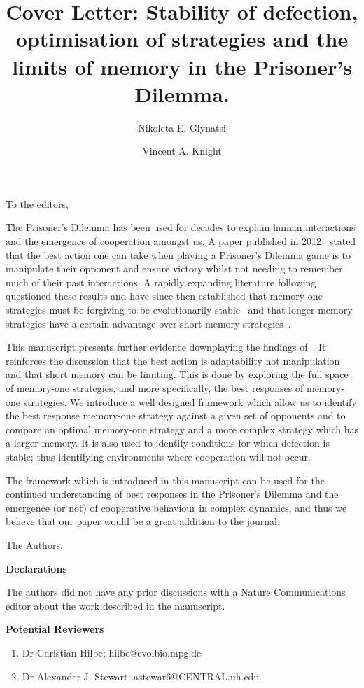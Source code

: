 \documentclass{article}
\title{Cover Letter: Stability of defection, optimisation of strategies and the limits of
memory in the Prisoner's Dilemma.}
\author[1, *]{Nikoleta E. Glynatsi}
\author[1]{Vincent A. Knight}
\affil[1]{Cardiff University, School of Mathematics, Cardiff, United Kingdom}
\affil[*]{Corresponding author: Nikoleta E. Glynatsi, glynatsine@cardiff.ac.uk}
\date{}
\begin{document}
 
\maketitle

To the editors,
 
The Prisoner's Dilemma has been used for decades to explain human interactions
and the emergence of cooperation amongst us. A paper published in
2012~\cite{Press2012} stated that the best action one can take when playing a
Prisoner's Dilemma game is to manipulate their opponent and ensure victory
whilst not needing to remember much of their past interactions. A rapidly
expanding literature following~\cite{Press2012} questioned these results and
have since then established that memory-one strategies must be forgiving to be
evolutionarily stable~\cite{adami2013} and that longer-memory strategies have
a certain advantage over short memory strategies~\cite{Hilbe2017}.

This manuscript presents further evidence downplaying the findings
of~\cite{Press2012}. It reinforces the discussion that the best action is
adaptability not manipulation and that short memory can be limiting. This is
done by exploring the full space of memory-one strategies, and more specifically, the best
responses of memory-one strategies. We introduce a well designed framework which
allow us to identify the best response memory-one strategy against a given set
of opponents and to compare an optimal memory-one strategy and a more complex
strategy which has a larger memory. It is also used to identify conditions for
which defection is stable; thus identifying environments where cooperation will
not occur.
 
The framework which is introduced in this manuscript can be used for the
continued understanding of best responses in the Prisoner’s Dilemma and the
emergence (or not) of cooperative behaviour in complex dynamics, and thus we
believe that our paper would be a great addition to the journal.
 
The Authors.

\textbf{Declarations}

The authors did not have any prior discussions with a Nature Communications editor
about the work described in the manuscript.

\textbf{Potential Reviewers}

\begin{enumerate}
    \item Dr Christian Hilbe; hilbe@evolbio.mpg.de
    \item Dr Alexander J. Stewart; astewar6@CENTRAL.uh.edu
\end{enumerate}

 


\end{document}
